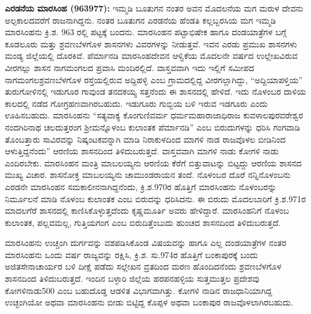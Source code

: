 \textbf{ ಎರಡನೆಯ ಮಾರಸಿಂಹ (963977):} ಇಮ್ಮಡಿ ಬೂತುಗನ ನಂತರ ಅವನ ಮೊದಲನೆಯ ಮಗ ಮರುಳ ದೇವನು ಅಲ್ಪಕಾಲದವರೆಗೆ ರಾಜನಾಗಿದ್ದನು. ನಂತರ ಬೂತುಗನ ಎರಡನೆಯ ಹೆಂಡತಿ ಕಲ್ಲಬ್ಬರಸಿಯ ಮಗ ಇಮ್ಮಡಿ ಮಾರಸಿಂಹನು ಕ್ರಿ.ಶ. 963 ರಲ್ಲಿ ಪಟ್ಟಕ್ಕೆ ಬಂದನು. ಮಾರಸಿಂಹನ ಪಟ್ಟಾಭಿಷೇಕ ಹಾಗೂ ದಂಡಯಾತ್ರೆಗಳ ಬಗ್ಗೆ ಕೂಡಲೂರು ಮತ್ತು ಶ್ರವಣಬೆಳಗೊಳ ಶಾಸನಗಳು ವಿವರಗಳನ್ನು ನೀಡುತ್ತವೆ. ಇವನ ಎರಡು ಪ್ರಮುಖ ಶಾಸನಗಳು ಮಂಡ್ಯ ಜಿಲ್ಲೆಯಲ್ಲಿ ದೊರಕಿವೆ. ಪೆರ್ಮಾನಡಿ ಮಾರಸಿಂಹದೇವನ ಆಳ್ವಿಕೆಯ ಮೊದಲನೇ ವರ್ಷದ ಉಲ್ಲೇಖವಿರುವ ವೀರಗಲ್ಲು ಶಾಸನ ನಾಗಮಂಗಲದ ಪ್ರವಾಸಿ ಮಂದಿರಲ್ಲಿದೆ. ವಾಸ್ತವವಾಗಿ ಇದು ಇಲ್ಲಿಗೆ ಸಮೀಪದ ನಾಗಮಂಗಲಶ್ರವಣಬೆಳಗೊಳ ರಸ್ತೆಯಲ್ಲಿರುವ ಅದ್ದಿಹಳ್ಳಿ ಎಂಬ ಗ್ರಾಮದಲ್ಲಿದ್ದ ವೀರಗಲ್ಲಾಗಿದ್ದು, “ಅದ್ದಿಯಾಪಳ್ತಿಯ” ತುರುಗೋಳಿನಲ್ಲಿ ಇಡುಗೂರ ಗಾವುಂಡ ತನದಕಯ್ಯ ಸತ್ತನೆಂದು ಈ ಶಾಸನದಲ್ಲಿ ಹೇಳಿದೆ. ಇದು ನೊಳಂಬರ ದಾಳಿಯ ಕಾಲದಲ್ಲಿ ನಡೆದ ಗೋಗ್ರಹಣವಾಗಿರಬಹುದು. ಇಡುಗೂರು ಗುಬ್ಬಿಯ ಬಳಿ ಇರುವ ಇಡಗೂರು ಎಂದು ಊಹಿಸಬಹುದು. ಮಾರಸಿಂಹನು “ಸತ್ಯವಾಕ್ಯ ಕೊಂಗುಣಿವರ್ಮ ಧರ್ಮಮಹಾರಾಜಾಧಿರಾಜ ಕುವಳಾಲಪುರವರೇಶ್ವರ ನಂದಗಿರಿನಾಥ ಚಲದುತ್ತರಂಗ ಶ‍್ರೀಮನ್ನೊಳಂಬ ಕುಲಾಂತಕ ಪೆರ್ಮಾನಡಿ” ಎಂಬ ಬಿರುದುಗಳನ್ನು ಧರಿಸಿ ಗಂಗವಾಡಿ ತೊಂಬತ್ತಾರು ಸಾವಿರವನ್ನು ನಿಷ್ಕಂಟಕವನ್ನಾಗಿ ಮಾಡಿ ನಿರಾಕುಳದಿಂದ ಮಾಗಳಿ ನಾಡ ರಾಜವೊಳಲ ಬೀಡಿನಿಂದ ಆಳುತ್ತಿದ್ದನೆಂದು” ಆರಣಿಯ ಶಾಸನದಿಂದ ತಿಳಿದುಬರುತ್ತದೆ. ವಾಸ್ತವವಾಗಿ ಮಾಗಳಿ ನಾಡು ಕೋಗಳಿ ನಾಡು ಎಂದಿರಬೇಕು. ಮಾರಸಿಂಹನ ಮಂತ್ರಿ ಮಾಬಲಯ್ಯನು ಆರಣಿಯ ಕೆರೆಗೆ ಬಿತ್ತುವಾಟನ್ನು ಬಿಟ್ಟದ್ದು ಆರಣಿಯ ಶಾಸನದ ಮುಖ್ಯ ವಿಚಾರ. ಶಾಸನೋಕ್ತ ಮಾಬಲಯ್ಯನು ಚಾಮುಂಡರಾಯನ ತಂದೆ. ನೊಳಂಬರ ದೊರೆ ನನ್ನಿನೊಳಂಬನು ಎರಡನೇ ಮಾರಸಿಂಹನ ಸಮಕಾಲೀನನಾಗಿದ್ದನೆಂದು, ಕ್ರಿ.ಶ.970ರ ಹೊತ್ತಿಗೆ ಮಾರಸಿಂಹನು ನೊಳಂಬರನ್ನು ನಿರ್ಮೂಲನೆ ಮಾಡಿ ನೊಳಂಬ ಕುಲಾಂತಕ ಎಂಬ ಬಿರುದನ್ನು ಧರಿಸಿದನು. ಈ ಬಿರುದು ಮೊದಲಬಾರಿಗೆ ಕ್ರಿ.ಶ.971ರ ಮಾದಲಗೆರೆ ಶಾಸನದಲ್ಲಿ ಕಾಣಿಸಿಕೊಳ್ಳುತ್ತದೆಂದು ಕೃಷ್ಣಮೂರ್ತಿ ಅವರು ಹೇಳಿದ್ದಾರೆ. ಮಾರಸಿಂಹನಿಗೆ ನೊಳಂಬ ಕುಲಾಂತಕ, ಪಲ್ಲವಮಲ್ಲ, ಗುತ್ತಿಯಗಂಗ ಎಂಬ ಬಿರುದಿತ್ತೆಂಬುದು ಹುಂಚದ ಶಾಸನದಿಂದ ತಿಳಿದುಬರುತ್ತದೆ.

ಮಾರಸಿಂಹನು ಉಚ್ಚಂಗಿ ದುರ್ಗವನ್ನು ವಶಪಡಿಸಿಕೊಂಡ ವಿಷಯವನ್ನು ಹಾಗೂ ಎಲ್ಲ ದಂಡಯಾತ್ರೆಗಳ ನಂತರ ಮಾರಸಿಂಹನು ಒಂದು ವರ್ಷ ರಾಜ್ಯವನ್ನು ರಕ್ಷಿಸಿ, ಕ್ರಿ.ಶ. ಸು.974ರ ಹೊತ್ತಿಗೆ ಬಂಕಾಪುರಕ್ಕೆ ಬಂದು ಅಜಿತಸೇನಾಚಾರ್ಯರ ಬಳಿ ದೀಕ್ಷೆ ಪಡೆದು ಸಲ್ಲೇಖನ ವ್ರತದಿಂದ ಮರಣ ಹೊಂದಿದನೆಂದು ಶ್ರವಣಬೆಳಗೊಳ ಶಾಸನದಿಂದ ತಿಳಿದುಬರುತ್ತದೆ. ಇಂದಿನ ಬಳ್ಳಾರಿ ಜಿಲ್ಲೆಯ ಹರಪನಹಳ್ಳಿಯ ಸುತ್ತಮುತ್ತಲ ಪ್ರದೇಶವು ಕೋಗಳಿನಾಡು500 ಎಂಬ ಬಹುದೊಡ್ಡ ಆಡಳಿತ ವಿಭಾಗವಾಗಿತ್ತು. ಕೋಗಳಿ ನಾಡಿನ ರಾಜಧಾನಿಯಾಗಿದ್ದ ಉಚ್ಛಂಗಿಯೋ ಅಥವಾ ಮಾರಸಿಂಹನು ಬೀಡು ಬಿಟ್ಟಿದ್ದ ಕೊಪ್ಪಳ ಅಥವಾ ಬಂಕಾಪುರ ರಾಜವೊಳಲಾಗಿರಬಹುದು. 

